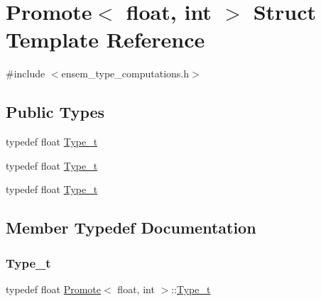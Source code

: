 \hypertarget{structPromote_3_01float_00_01int_01_4}{}\section{Promote$<$ float, int $>$ Struct Template Reference}
\label{structPromote_3_01float_00_01int_01_4}


{\ttfamily \#include $<$ensem\+\_\+type\+\_\+computations.\+h$>$}

\subsection*{Public Types}
\begin{DoxyCompactItemize}
\item 
typedef float \mbox{\hyperlink{structPromote_3_01float_00_01int_01_4_a8df52b198586e88fc51366c1f8774543}{Type\+\_\+t}}
\item 
typedef float \mbox{\hyperlink{structPromote_3_01float_00_01int_01_4_a8df52b198586e88fc51366c1f8774543}{Type\+\_\+t}}
\item 
typedef float \mbox{\hyperlink{structPromote_3_01float_00_01int_01_4_a8df52b198586e88fc51366c1f8774543}{Type\+\_\+t}}
\end{DoxyCompactItemize}


\subsection{Member Typedef Documentation}
\mbox{\label{structPromote_3_01float_00_01int_01_4_a8df52b198586e88fc51366c1f8774543}} 
\subsubsection{\texorpdfstring{Type\_t}{Type\_t}\hspace{0.1cm}{\footnotesize\ttfamily [1/3]}}
{\footnotesize\ttfamily typedef float \mbox{\hyperlink{structPromote}{Promote}}$<$ float, int $>$\+::\mbox{\hyperlink{structPromote_3_01float_00_01int_01_4_a8df52b198586e88fc51366c1f8774543}{Type\+\_\+t}}}

\mbox{\label{structPromote_3_01float_00_01int_01_4_a8df52b198586e88fc51366c1f8774543}} 
